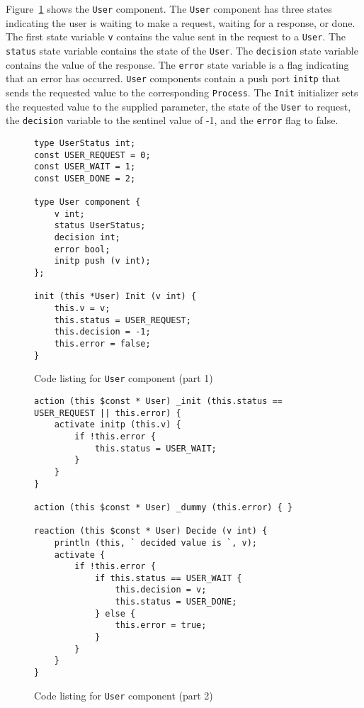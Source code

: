 Figure~\ref{user1} shows the \verb+User+ component.
The \verb+User+ component has three states indicating the user is waiting to make a request, waiting for a response, or done.
The first state variable \verb+v+ contains the value sent in the request to a \verb+User+.
The \verb+status+ state variable contains the state of the \verb+User+.
The \verb+decision+ state variable contains the value of the response.
The \verb+error+ state variable is a flag indicating that an error has occurred.
\verb+User+ components contain a push port \verb+initp+ that sends the requested value to the corresponding \verb+Process+.
The \verb+Init+ initializer sets the requested value to the supplied parameter, the state of the \verb+User+ to request, the \verb+decision+ variable to the sentinel value of -1, and the \verb+error+ flag to false.

\begin{figure}
\begin{verbatim}
type UserStatus int;
const USER_REQUEST = 0;
const USER_WAIT = 1;
const USER_DONE = 2;

type User component {
    v int;
    status UserStatus;
    decision int;
    error bool;
    initp push (v int);
};

init (this *User) Init (v int) {
    this.v = v;
    this.status = USER_REQUEST;
    this.decision = -1;
    this.error = false;
}
\end{verbatim}
\cprotect\caption{Code listing for \verb+User+ component (part 1)}
\label{user1}
\end{figure}

\begin{figure}
\begin{verbatim}
action (this $const * User) _init (this.status == USER_REQUEST || this.error) {
    activate initp (this.v) {
        if !this.error {
            this.status = USER_WAIT;
        }
    }
}

action (this $const * User) _dummy (this.error) { }

reaction (this $const * User) Decide (v int) {
    println (this, ` decided value is `, v);
    activate {
        if !this.error {
            if this.status == USER_WAIT {
                this.decision = v;
                this.status = USER_DONE;
            } else {
                this.error = true;
            }
        }
    }
}
\end{verbatim}
\cprotect\caption{Code listing for \verb+User+ component (part 2)}
\label{user2}
\end{figure}

